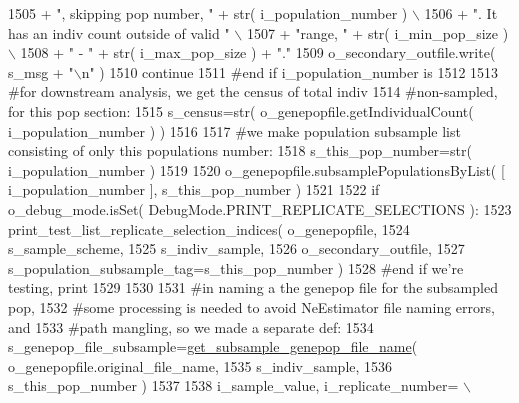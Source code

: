 \begin{DoxyCode}
1505                                 + \textcolor{stringliteral}{", skipping pop number, "}  + str( i\_population\_number ) \(\backslash\)
1506                                 + \textcolor{stringliteral}{".  It has an indiv count outside of valid "} \(\backslash\)
1507                                 + \textcolor{stringliteral}{"range, "} + str( i\_min\_pop\_size ) \(\backslash\)
1508                                 + \textcolor{stringliteral}{" - "} + str( i\_max\_pop\_size ) + \textcolor{stringliteral}{"."}
1509                 o\_secondary\_outfile.write( s\_msg + \textcolor{stringliteral}{"\(\backslash\)n"} )
1510                 \textcolor{keywordflow}{continue}
1511             \textcolor{comment}{#end if i\_population\_number is}
1512 
1513             \textcolor{comment}{#for downstream analysis, we get the census of total indiv}
1514             \textcolor{comment}{#non-sampled, for this pop section:}
1515             s\_census=str( o\_genepopfile.getIndividualCount( i\_population\_number ) )
1516 
1517             \textcolor{comment}{#we make population subsample list consisting of only this populations number:}
1518             s\_this\_pop\_number=str( i\_population\_number ) 
1519 
1520             o\_genepopfile.subsamplePopulationsByList( [ i\_population\_number ], s\_this\_pop\_number )
1521 
1522             \textcolor{keywordflow}{if} o\_debug\_mode.isSet( DebugMode.PRINT\_REPLICATE\_SELECTIONS ):
1523                 print\_test\_list\_replicate\_selection\_indices( o\_genepopfile, 
1524                                         s\_sample\_scheme,    
1525                                         s\_indiv\_sample, 
1526                                         o\_secondary\_outfile, 
1527                                         s\_population\_subsample\_tag=s\_this\_pop\_number )
1528             \textcolor{comment}{#end if we're testing, print }
1529             
1530 
1531             \textcolor{comment}{#in naming a the genepop file for the subsampled pop,}
1532             \textcolor{comment}{#some processing is needed to avoid NeEstimator file naming errors, and}
1533             \textcolor{comment}{#path mangling, so we made a separate def:}
1534             s\_genepop\_file\_subsample=\hyperlink{namespacenegui_1_1pgdriveneestimator_a84955fc339f0354149185b5fa6444340}{get\_subsample\_genepop\_file\_name}( 
      o\_genepopfile.original\_file\_name, 
1535                                                     s\_indiv\_sample, 
1536                                                     s\_this\_pop\_number )
1537 
1538             i\_sample\_value, i\_replicate\_number= \(\backslash\)

\end{DoxyCode}
